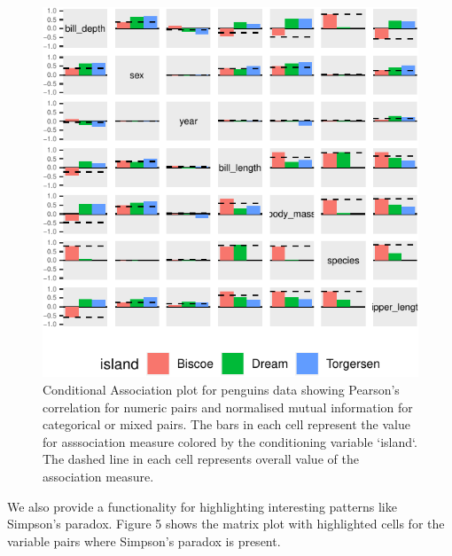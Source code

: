 \begin{Schunk}
\begin{figure}

{\centering \includegraphics{rj_paper_files/figure-latex/cond-assoc-1} 

}

\caption[Conditional Association plot for penguins data showing Pearson's correlation for numeric pairs and normalised mutual information for categorical or mixed pairs]{Conditional Association plot for penguins data showing Pearson's correlation for numeric pairs and normalised mutual information for categorical or mixed pairs. The bars in each cell represent the value for asssociation measure colored by the conditioning variable `island`. The dashed line in each cell represents overall value of the association measure.}\label{fig:cond-assoc}
\end{figure}
\end{Schunk}

We also provide a functionality for highlighting interesting patterns
like Simpson's paradox. Figure 5 shows the matrix plot with highlighted
cells for the variable pairs where Simpson's paradox is present.

